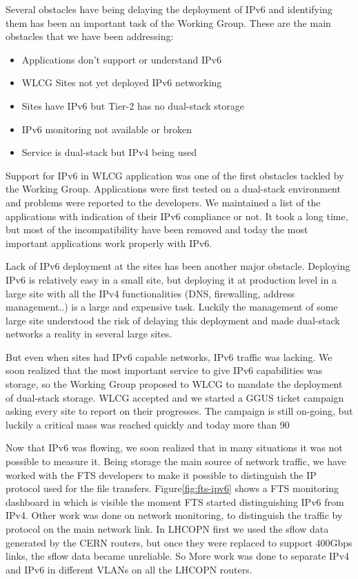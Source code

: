 
Several obstacles have being delaying the deployment of IPv6 and identifying them has been an important task of the Working Group.
These are the main obstacles that we have been addressing:
\begin{itemize}
  \item Applications don't support or understand IPv6
  \item WLCG Sites not yet deployed IPv6 networking
  \item Sites have IPv6 but Tier-2 has no dual-stack storage
  \item IPv6 monitoring not available or broken
  \item Service is dual-stack but IPv4 being used
\end{itemize}

Support for IPv6 in WLCG application was one of the first obstacles tackled by the Working Group. Applications were first tested on a dual-stack environment and problems were reported to the developers. We maintained a list of the applications with indication of their IPv6 compliance or not. It took a long time, but most of the incompatibility have been removed and today the most important applications work properly with IPv6.

Lack of IPv6 deployment at the sites has been another major obstacle. Deploying IPv6 is relatively easy in a small site, but deploying it at production level in a large site with all the IPv4 functionalities (DNS, firewalling, address management..) is a large and expensive task. Luckily the management of some large site understood the risk of delaying this deployment and made dual-stack networks a reality in several large sites.

But even when sites had IPv6 capable networks, IPv6 traffic was lacking. We soon realized that the most important service to give IPv6 capabilities was storage, so the Working Group proposed to WLCG to mandate the deployment of dual-stack storage. WLCG accepted and we started a GGUS ticket campaign asking every site to report on their progresses.
The campaign is still on-going, but luckily a critical mass was reached quickly and today more than 90%

Now that IPv6 was flowing, we soon realized that in many situations it was not possible to measure it. Being storage the main source of network traffic, we have worked with the FTS developers to make it possible to distinguish the IP protocol used for the file transfers. Figure\ref{fig:fts-ipv6} shows a FTS monitoring dashboard in which is visible the moment FTS started distinguishing IPv6 from IPv4.
Other work was done on network monitoring, to distinguish the traffic by protocol on the main network link. In LHCOPN first we used the sflow data generated by the CERN routers, but  once they were replaced to support 400Gbps links, the sflow data became unreliable. So More work was done to separate IPv4 and IPv6 in different VLANs on all the LHCOPN routers.

